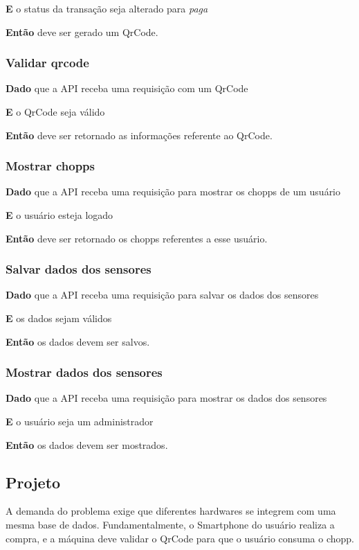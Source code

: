\textbf{E} o status da transação seja alterado para \textit{paga}

\textbf{Então} deve ser gerado um QrCode.

\subsubsection{Validar qrcode}

\textbf{Dado} que a API receba uma requisição com um QrCode

\textbf{E} o QrCode seja válido

\textbf{Então} deve ser retornado as informações referente ao QrCode.

\subsubsection{Mostrar chopps}

\textbf{Dado} que a API receba uma requisição para mostrar os chopps de um usuário

\textbf{E} o usuário esteja logado

\textbf{Então} deve ser retornado os chopps referentes a esse usuário.

\subsubsection{Salvar dados dos sensores}

\textbf{Dado} que a API receba uma requisição para salvar os dados dos sensores

\textbf{E} os dados sejam válidos

\textbf{Então} os dados devem ser salvos.

\subsubsection{Mostrar dados dos sensores}

\textbf{Dado} que a API receba uma requisição para mostrar os dados dos sensores

\textbf{E} o usuário seja um administrador

\textbf{Então} os dados devem ser mostrados.

\subsection{Projeto}

A demanda do problema exige que diferentes hardwares se integrem com uma
mesma base de dados. Fundamentalmente, o Smartphone do usuário realiza a compra, e
a máquina deve validar o QrCode para que o usuário consuma o chopp.

